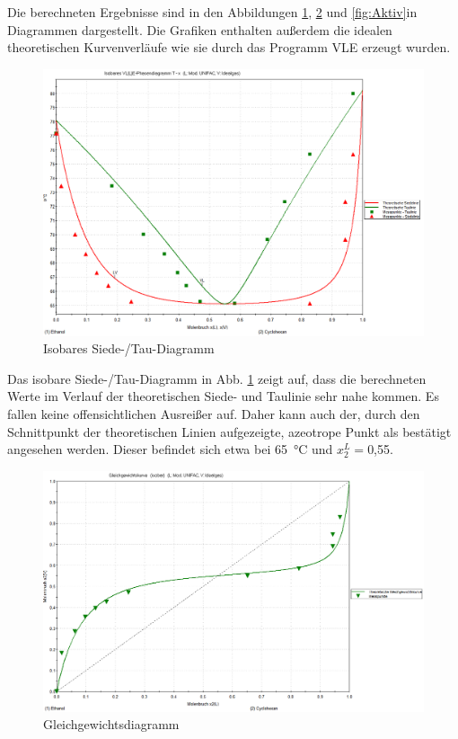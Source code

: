  Die berechneten Ergebnisse sind in den Abbildungen \ref{fig:T-x2-isobar}, \ref{fig:gleichgewichtsdiagramm} und \ref{fig:Aktiv}\hspace{1mm}in Diagrammen dargestellt. Die Grafiken enthalten außerdem die idealen theoretischen Kurvenverläufe wie sie durch das Programm VLE erzeugt wurden.
\begin{figure}[h!]
	\centering
	\includegraphics[width=1.1\linewidth]{img/VLE-T-x-isobar}
	\caption{Isobares Siede-/Tau-Diagramm}
	\label{fig:T-x2-isobar}
\end{figure}
Das isobare Siede-/Tau-Diagramm in Abb. \ref{fig:T-x2-isobar} zeigt auf, dass die berechneten Werte im Verlauf der theoretischen Siede- und Taulinie sehr nahe kommen. Es fallen keine offensichtlichen Ausreißer auf. Daher kann auch der, durch den Schnittpunkt der theoretischen Linien aufgezeigte, azeotrope Punkt als bestätigt angesehen werden. Dieser befindet sich etwa bei \SI{65}{\degreeCelsius} und $x_2^L=$0,55.
\begin{figure}[h!]
	\centering
	\includegraphics[width=1.1\linewidth]{img/gleichgewichtsdiagramm}
	\caption{Gleichgewichtsdiagramm}
	\label{fig:gleichgewichtsdiagramm}
\end{figure}
